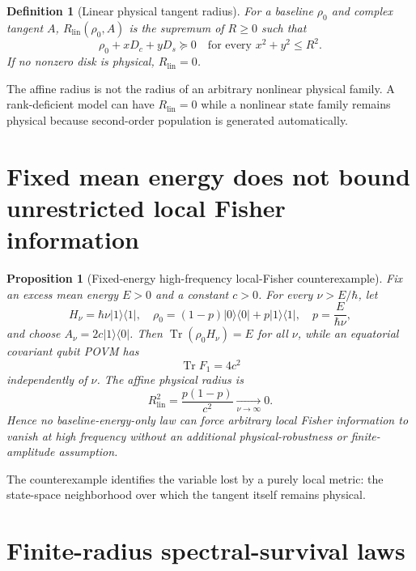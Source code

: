 \documentclass[aps,pra,preprint,nofootinbib]{revtex4-2}
\newtheorem{proposition}{Proposition}
\newtheorem{definition}{Definition}
\newcommand{\Tr}{\operatorname{Tr}}
\newcommand{\Rlin}{R_{\mathrm{lin}}}
\newcommand{\rhozero}{\rho_0}
\newcommand{\Fcl}{F}
\begin{document}
\begin{definition}[Linear physical tangent radius]
For a baseline $\rhozero$ and complex tangent $A$, $\Rlin(\rhozero,A)$ is the supremum of $R\ge0$ such that
\begin{equation}
\rhozero+xD_c+yD_s\succeq0
\quad\text{for every }x^2+y^2\le R^2.
\label{eq:RlinDef}
\end{equation}
If no nonzero disk is physical, $\Rlin=0$.
\end{definition}

The affine radius is not the radius of an arbitrary nonlinear physical family. A rank-deficient model can have $\Rlin=0$ while a nonlinear state family remains physical because second-order population is generated automatically.

\section{Fixed mean energy does not bound unrestricted local Fisher information}
\label{sec:nogo}

\begin{proposition}[Fixed-energy high-frequency local-Fisher counterexample]
\label{prop:nogo}
Fix an excess mean energy $E>0$ and a constant $c>0$. For every $\nu>E/\hbar$, let
\begin{equation}
H_\nu=\hbar\nu |1\rangle\!\langle1|,
\quad
\rhozero=(1-p)|0\rangle\!\langle0|+p|1\rangle\!\langle1|,
\quad
p=\frac{E}{\hbar\nu},
\end{equation}
and choose $A_\nu=2c|1\rangle\!\langle0|$. Then $\Tr(\rhozero H_\nu)=E$ for all $\nu$, while an equatorial covariant qubit POVM has
\begin{equation}
\Tr \Fcl_1=4c^2
\end{equation}
independently of $\nu$. The affine physical radius is
\begin{equation}
\Rlin^2=\frac{p(1-p)}{c^2}\xrightarrow[\nu\to\infty]{}0.
\end{equation}
Hence no baseline-energy-only law can force arbitrary local Fisher information to vanish at high frequency without an additional physical-robustness or finite-amplitude assumption.
\end{proposition}

The counterexample identifies the variable lost by a purely local metric: the state-space neighborhood over which the tangent itself remains physical.

\section{Finite-radius spectral-survival laws}
\label{sec:finite-radius}
\end{document}
